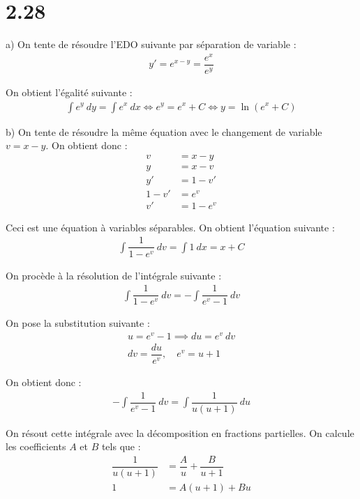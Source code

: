 \section*{2.28}

a) On tente de résoudre l'EDO suivante par séparation de variable :
\begin{align*}
    y' = e^{x-y} = \dfrac{e^x}{e^y}
\end{align*}

On obtient l'égalité suivante :
\begin{align*}
    \int{e^y\ dy} = \int{e^x\ dx} \iff e^y = e^x + C \iff y = \ln(e^x + C)
\end{align*}

b) On tente de résoudre la même équation avec le changement de variable
$v = x-y$. On obtient donc :
\begin{align*}
    v &= x-y \\
    y &= x-v \\
    y' &= 1-v' \\
    1-v' &= e^v \\
    v' &= 1-e^v 
\end{align*}

Ceci est une équation à variables séparables. On obtient l'équation suivante :
\begin{align*}
    \int{\dfrac{1}{1-e^v}\ dv} = \int{1\ dx} = x + C
\end{align*}

On procède à la résolution de l'intégrale suivante :
\begin{align*}
    \int{\dfrac{1}{1-e^v}\ dv} = -\int{\dfrac{1}{e^v - 1}\ dv}
\end{align*}

On pose la substitution suivante :
\begin{gather*}
    u = e^v - 1 \implies du = e^v\ dv \\
    dv = \dfrac{du}{e^v},\quad e^v = u + 1
\end{gather*}

On obtient donc :
\begin{align*}
    -\int{\dfrac{1}{e^v - 1}\ dv} = \int{\dfrac{1}{u(u+1)}\ du}
\end{align*}

On résout cette intégrale avec la décomposition en fractions partielles. On
calcule les coefficients $A$ et $B$ tels que :
\begin{align*}
    \dfrac{1}{u(u+1)} &= \dfrac{A}{u} + \dfrac{B}{u+1} \\
    1 &= A(u+1) +Bu
\end{align*}


